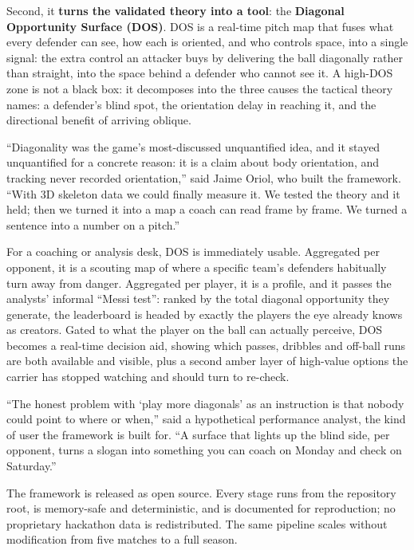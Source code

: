 \documentclass[11pt]{article}
\begin{document}
Second, it \textbf{turns the validated theory into a tool}: the
\textbf{Diagonal Opportunity Surface (DOS)}. DOS is a real-time pitch map
that fuses what every defender can see, how each is oriented, and who
controls space, into a single signal: the extra control an attacker buys
by delivering the ball diagonally rather than straight, into the space
behind a defender who cannot see it. A high-DOS zone is not a black box: it
decomposes into the three causes the tactical theory names: a defender's
blind spot, the orientation delay in reaching it, and the directional
benefit of arriving oblique.

``Diagonality was the game's most-discussed unquantified idea, and it
stayed unquantified for a concrete reason: it is a claim about body
orientation, and tracking never recorded orientation,'' said Jaime Oriol,
who built the framework. ``With 3D skeleton data we could finally measure
it. We tested the theory and it held; then we turned it into a map a coach
can read frame by frame. We turned a sentence into a number on a pitch.''

For a coaching or analysis desk, DOS is immediately usable. Aggregated per
opponent, it is a scouting map of where a specific team's defenders
habitually turn away from danger. Aggregated per player, it is a profile,
and it passes the analysts' informal ``Messi test'': ranked by the total
diagonal opportunity they generate, the leaderboard is headed by exactly
the players the eye already knows as creators. Gated to what the player on
the ball can actually perceive, DOS becomes a real-time decision aid,
showing which passes, dribbles and off-ball runs are both available and
visible, plus a second amber layer of high-value options the carrier has
stopped watching and should turn to re-check.

``The honest problem with `play more diagonals' as an instruction is that
nobody could point to where or when,'' said a hypothetical performance
analyst, the kind of user the framework is built for. ``A surface that
lights up the blind side, per opponent, turns a slogan into something you
can coach on Monday and check on Saturday.''

The framework is released as open source. Every stage runs from the
repository root, is memory-safe and deterministic, and is documented for
reproduction; no proprietary hackathon data is redistributed. The same
pipeline scales without modification from five matches to a full season.

\end{document}
